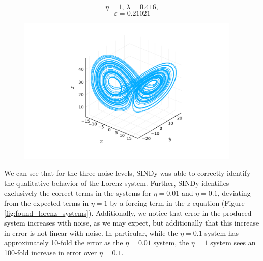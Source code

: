 \documentclass[10pt]{paper}
\begin{document}
\begin{figure}[h]
\begin{minipage}{0.32\textwidth}
\begin{center}
		\end{center}
	\end{minipage}%
	\begin{minipage}{0.32\textwidth}
		\[ \eta = 1, \, \lambda = 0.416, \]
		\[ \varepsilon = 0.21021 \]
		\begin{center}
			\includegraphics[width = 0.95\textwidth, trim={4.3cm, 1.6cm, 4.3cm, 2.5cm}, clip]{found_lorenz_1.pdf}
		\end{center}
	\end{minipage}
\end{figure}	


We can see that for the three noise levels, SINDy was able to correctly identify the qualitative behavior of the Lorenz system. 
Further, SINDy identifies exclusively the correct terms in the systems for $\eta = 0.01$ and $\eta = 0.1$, deviating from the expected terms in $\eta = 1$ by a forcing term in the $\dot z$ equation (Figure \ref{fig:found_lorenz_systems}). 
Additionally, we notice that error in the produced system increases with noise, as we may expect, but additionally that this increase in error is not linear with noise. In particular, while the $\eta = 0.1$ system has approximately 10-fold the error as the $\eta = 0.01$ system, the $\eta = 1$ system sees an 100-fold increase in error over $\eta = 0.1$.   
\end{document}
